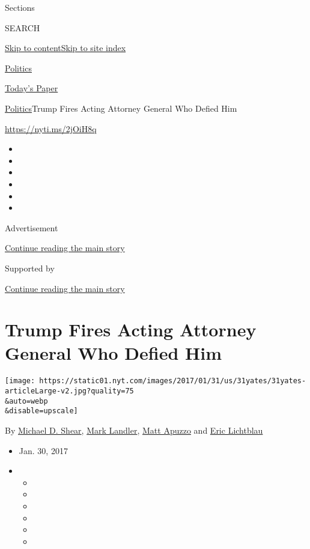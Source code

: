 Sections

SEARCH

\protect\hyperlink{site-content}{Skip to
content}\protect\hyperlink{site-index}{Skip to site index}

\href{https://www.nytimes.com/section/politics}{Politics}

\href{https://myaccount.nytimes.com/auth/login?response_type=cookie\&client_id=vi}{}

\href{https://www.nytimes.com/section/todayspaper}{Today's Paper}

\href{/section/politics}{Politics}\textbar{}Trump Fires Acting Attorney
General Who Defied Him

\url{https://nyti.ms/2jOiH8q}

\begin{itemize}
\item
\item
\item
\item
\item
\item
\end{itemize}

Advertisement

\protect\hyperlink{after-top}{Continue reading the main story}

Supported by

\protect\hyperlink{after-sponsor}{Continue reading the main story}

\hypertarget{trump-fires-acting-attorney-general-who-defied-him}{%
\section{Trump Fires Acting Attorney General Who Defied
Him}\label{trump-fires-acting-attorney-general-who-defied-him}}

\texttt{[image: https://static01.nyt.com/images/2017/01/31/us/31yates/31yates-articleLarge-v2.jpg?quality=75\\\&auto=webp\\\&disable=upscale]}

By \href{http://www.nytimes.com/by/michael-d-shear}{Michael D. Shear},
\href{http://www.nytimes.com/by/mark-landler}{Mark Landler},
\href{http://www.nytimes.com/by/matt-apuzzo}{Matt Apuzzo} and
\href{http://www.nytimes.com/by/eric-lichtblau}{Eric Lichtblau}

\begin{itemize}
\item
  Jan. 30, 2017
\item
  \begin{itemize}
  \item
  \item
  \item
  \item
  \item
  \item
  \end{itemize}
\end{itemize}

